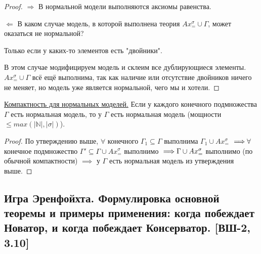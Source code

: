 \documentclass[a4paper, fleqn]{article}
\begin{document}
    \begin{proof}
    $\boxed{\Rightarrow}$ В нормальной модели выполняются аксиомы равенства.
    
    $\boxed{\Leftarrow}$ В каком случае модель, в которой выполнена теория $Ax_{=}^{\sigma} \cup \Gamma$, может оказаться не нормальной? 
    
    Только если у каких-то элементов есть "двойники". 
    
    В этом случае модифицируем модель и склеим все дублирующиеся элементы. $Ax_{=}^{\sigma} \cup \Gamma$ всё ещё выполнима, так как наличие или отсутствие двойников ничего не меняет, но модель уже является нормальной, чего мы и хотели.
    
    \end{proof}
    
    \doublespacing \underline{Компактность для нормальных моделей.} Если у каждого конечного подмножества $\Gamma$ есть нормальная модель, то у $\Gamma$ есть нормальная модель (мощности $\leq max (|\mathbb{N}| , | \sigma| )$).
    
    \begin{proof}
    
    По утверждению выше, $\forall$ конечного $\Gamma_1 \subseteq \Gamma$ выполнима $\Gamma_1 \cup Ax_{=}^{\sigma}$  $\implies \\ 
    \forall$ конечное подмножество $ \Gamma' \subseteq \Gamma \cup Ax_{=}^{\sigma} $ выполнимо $\implies \\ \Gamma \cup Ax_{=}^{\sigma}$ выполнимо (по обычной компактности) $\implies$ у $\Gamma$ есть нормальная модель из утверждения выше.
    
    \end{proof}

    \subsection{Игра Эренфойхта. Формулировка основной теоремы и примеры применения: когда побеждает Новатор, и когда побеждает Консерватор. [ВШ-2, 3.10]}
\end{document}
